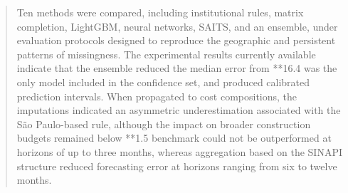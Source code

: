 \begin{abstract}
Ten methods were compared, including institutional rules, matrix completion, LightGBM, 
neural networks, SAITS, and an ensemble, under evaluation protocols designed to reproduce 
the geographic and persistent patterns of missingness. The experimental results currently 
available indicate that the ensemble reduced the median error from **16.4%
was the only model included in the confidence set, and produced calibrated prediction 
intervals. When propagated to cost compositions, the imputations indicated an asymmetric 
underestimation associated with the São Paulo-based rule, although the impact on broader 
construction budgets remained below **1.5%
benchmark could not be outperformed at horizons of up to three months, whereas aggregation 
based on the SINAPI structure reduced forecasting error at horizons ranging from six to 
twelve months.
\end{abstract}
